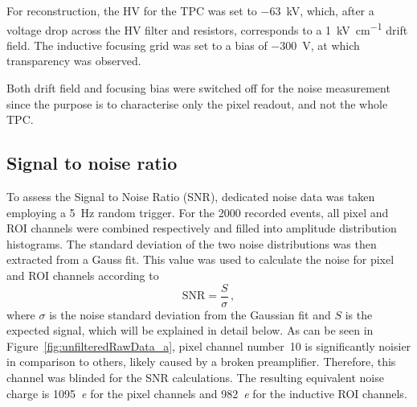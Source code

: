 \documentclass[instruments,article,submit,moreauthors,pdftex]{Definitions/mdpi}
\newcommand*{\m}{\mathrm}
\begin{document}
For reconstruction, the HV for the TPC was set to \SI{-63}{\kilo\volt}, which, after a voltage drop across the HV filter and resistors, corresponds to a \SI{1}{\kilo\volt\per\centi\meter} drift field. The inductive focusing grid was set to a bias of \SI{-300}{\volt}, at which transparency was observed. 

Both drift field and focusing bias were switched off for the noise measurement since the purpose is to characterise only the pixel readout, and not the whole TPC.


\subsection{Signal to noise ratio}

To assess the Signal to Noise Ratio (SNR), dedicated noise data was taken employing a \SI{5}{\hertz} random trigger.
For the \num{2000} recorded events, all pixel and ROI channels were combined respectively and filled into amplitude distribution histograms.
The standard deviation of the two noise distributions was then extracted from a Gauss fit.
This value was used to calculate the noise for pixel and ROI channels according to
\begin{equation}
\m{SNR} = \frac{S}{\sigma}\,\m{,}
\label{eq:snr}
\end{equation}
where $\sigma$ is the noise standard deviation from the Gaussian fit and $S$ is the expected signal, which will be explained in detail below.
As can be seen in Figure~\ref{fig:unfilteredRawData_a}, pixel channel number~\num{10} is significantly noisier in comparison to others, likely caused by a broken preamplifier.
Therefore, this channel was blinded for the SNR calculations.
The resulting equivalent noise charge is \SI{1095}{\elementarycharge} for the pixel channels and \SI{982}{\elementarycharge} for the inductive ROI channels.
\end{document}
